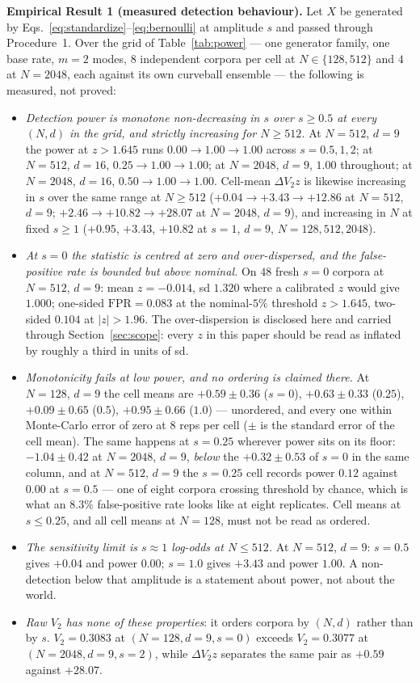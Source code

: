 \documentclass[11pt,a4paper]{article}
\theoremstyle{plain}
\theoremstyle{remark}
\theoremstyle{plain}
\begin{document}
\textbf{Empirical Result 1 (measured detection behaviour).} Let $X$ be generated by Eqs.~\eqref{eq:standardize}--\eqref{eq:bernoulli} at amplitude $s$ and passed through Procedure~1. Over the grid of Table~\ref{tab:power} --- one generator family, one base rate, $m=2$ modes, $8$ independent corpora per cell at $N\in\{128,512\}$ and $4$ at $N=2048$, each against its own curveball ensemble --- the following is measured, not proved:

\begin{itemize}
\item[(i)] \emph{Detection power is monotone non-decreasing in $s$ over $s\ge0.5$ at every $(N,d)$ in the grid, and strictly increasing for $N\ge512$.} At $N=512$, $d=9$ the power at $z>1.645$ runs $0.00\to1.00\to1.00$ across $s=0.5,1,2$; at $N=512$, $d=16$, $0.25\to1.00\to1.00$; at $N=2048$, $d=9$, $1.00$ throughout; at $N=2048$, $d=16$, $0.50\to1.00\to1.00$. Cell-mean $\Delta V_2z$ is likewise increasing in $s$ over the same range at $N\ge512$ ($+0.04\to+3.43\to+12.86$ at $N=512$, $d=9$; $+2.46\to+10.82\to+28.07$ at $N=2048$, $d=9$), and increasing in $N$ at fixed $s\ge1$ ($+0.95$, $+3.43$, $+10.82$ at $s=1$, $d=9$, $N=128,512,2048$).
\item[(ii)] \emph{At $s=0$ the statistic is centred at zero and over-dispersed, and the false-positive rate is bounded but above nominal.} On $48$ fresh $s{=}0$ corpora at $N=512$, $d=9$: mean $z=-0.014$, sd $1.320$ where a calibrated $z$ would give $1.000$; one-sided $\mathrm{FPR}=0.083$ at the nominal-$5\%$ threshold $z>1.645$, two-sided $0.104$ at $|z|>1.96$. The over-dispersion is disclosed here and carried through Section~\ref{sec:scope}: every $z$ in this paper should be read as inflated by roughly a third in units of sd.
\item[(iii)] \emph{Monotonicity fails at low power, and no ordering is claimed there.} At $N=128$, $d=9$ the cell means are $+0.59\pm0.36$ ($s{=}0$), $+0.63\pm0.33$ ($0.25$), $+0.09\pm0.65$ ($0.5$), $+0.95\pm0.66$ ($1.0$) --- unordered, and every one within Monte-Carlo error of zero at $8$ reps per cell ($\pm$ is the standard error of the cell mean). The same happens at $s=0.25$ wherever power sits on its floor: $-1.04\pm0.42$ at $N=2048$, $d=9$, \emph{below} the $+0.32\pm0.53$ of $s=0$ in the same column, and at $N=512$, $d=9$ the $s=0.25$ cell records power $0.12$ against $0.00$ at $s=0.5$ --- one of eight corpora crossing threshold by chance, which is what an $8.3\%$ false-positive rate looks like at eight replicates. Cell means at $s\le0.25$, and all cell means at $N=128$, must not be read as ordered.
\item[(iv)] \emph{The sensitivity limit is $s\approx1$ log-odds at $N\le512$.} At $N=512$, $d=9$: $s=0.5$ gives $+0.04$ and power $0.00$; $s=1.0$ gives $+3.43$ and power $1.00$. A non-detection below that amplitude is a statement about power, not about the world.
\item[(v)] \emph{Raw $V_2$ has none of these properties}: it orders corpora by $(N,d)$ rather than by $s$. $V_2=0.3083$ at $(N{=}128,d{=}9,s{=}0)$ exceeds $V_2=0.3077$ at $(N{=}2048,d{=}9,s{=}2)$, while $\Delta V_2z$ separates the same pair as $+0.59$ against $+28.07$.
\end{itemize}
\end{document}
